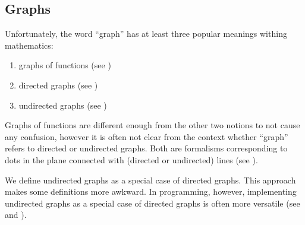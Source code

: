 \subsection{Graphs}\label{subsec:graphs}

\begin{remark}\label{remark:directed_and_undirected_graphs}
  Unfortunately, the word \enquote{graph} has at least three popular meanings withing mathematics:
  \begin{enumerate}
    \item graphs of functions (see )
    \item directed graphs (see )
    \item undirected graphs (see )
  \end{enumerate}

  Graphs of functions are different enough from the other two notions to not cause any confusion, however it is often not clear from the context whether \enquote{graph} refers to directed or undirected graphs. Both are formalisms corresponding to dots in the plane connected with (directed or undirected) lines (see ).

  We define undirected graphs as a special case of directed graphs. This approach makes some definitions more awkward. In programming, however, implementing undirected graphs as a special case of directed graphs is often more versatile (see \cite[section 5.4]{Erickson2019} and \cite[chapter 1, section 2.4]{Gondran1984}).
\end{remark}

